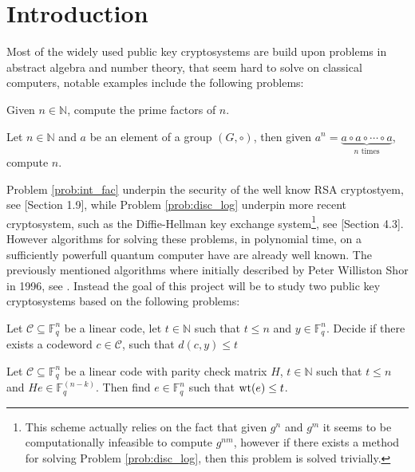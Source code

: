 \chapter{Introduction}
Most of the widely used public key cryptosystems are build upon problems in abstract algebra and number theory, that seem hard to solve on classical computers, notable examples include the following problems:
\begin{problem}\label{prob:int_fac}
  Given $n \in \mathbb{N}$, compute the prime factors of $n$.
\end{problem}
\begin{problem}\label{prob:disc_log}
  Let $n \in \mathbb{N}$ and $a$ be an element of a group $(G, \circ)$, then given $a^{n} = \underset{n \text{ times} }{\underbrace{a \circ a \circ \cdots \circ a}}$, compute $n$.
\end{problem}
Problem \ref{prob:int_fac} underpin the security of the well know RSA cryptostyem, see \cite{alg_lauritzen}[Section 1.9], while Problem \ref{prob:disc_log} underpin more recent cryptosystem, such as the Diffie-Hellman key exchange system\footnote{This scheme actually relies on the fact that given $g^{n}$ and $g^{m}$ it seems to be computationally infeasible to compute $g^{nm}$, however if there exists a method for solving Problem \ref{prob:disc_log}, then this problem is solved trivially.}, see \cite{n_t_and_c}[Section 4.3]. However algorithms for solving these problems, in polynomial time, on a sufficiently powerfull quantum computer have are already well known. The previously mentioned algorithms where initially described by Peter Williston Shor in 1996, see \cite{shor}. Instead the goal of this project will be to study two public key cryptosystems based on the following problems:

\begin{problem}\label{prob:general_decoding}
  Let $\mathcal{C} \subseteq \mathbb{F}_q^{n}$ be a linear code, let $t \in \mathbb{N}$ such that $t \leq n$ and $y \in \mathbb{F}_q^n$. Decide if there exists a codeword $c \in \mathcal{C}$, such that $d(c, y) \leq t$
\end{problem}

\begin{problem}\label{prob:coset_weight}
 Let $\mathcal{C} \subseteq \mathbb{F}_q^n$ be a linear code with parity check matrix $H$, $t \in \mathbb{N}$ such that $t \leq n$ and $He \in \mathbb{F}_q^{(n - k)}$. Then find $e \in \mathbb{F}_q^n$ such that $\mathrm{wt}(e) \leq t$.
\end{problem}

